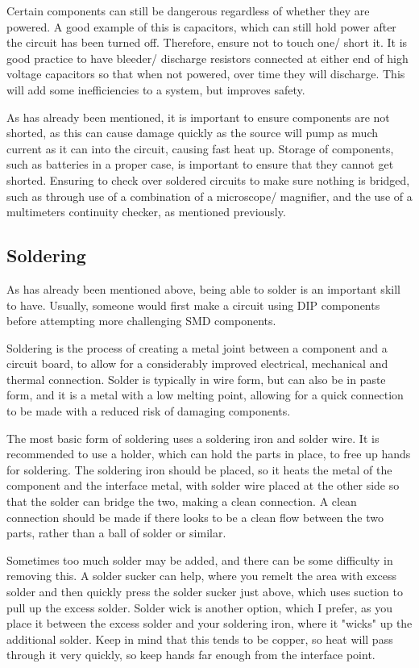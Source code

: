 \documentclass[a4paper,11pt]{report}
\begin{document}
Certain components can still be dangerous regardless of whether they are powered. A good example of this is capacitors, which can still hold power after the circuit has been turned off. Therefore, ensure not to touch one/ short it. It is good practice to have bleeder/ discharge resistors connected at either end of high voltage capacitors so that when not powered, over time they will discharge. This will add some inefficiencies to a system, but improves safety.

As has already been mentioned, it is important to ensure components are not shorted, as this can cause damage quickly as the source will pump as much current as it can into the circuit, causing fast heat up. Storage of components, such as batteries in a proper case, is important to ensure that they cannot get shorted. Ensuring to check over soldered circuits to make sure nothing is bridged, such as through use of a combination of a microscope/ magnifier, and the use of a multimeters continuity checker, as mentioned previously.

\subsection{Soldering}

As has already been mentioned above, being able to solder is an important skill to have. Usually, someone would first make a circuit using DIP components before attempting more challenging SMD components.

Soldering is the process of creating a metal joint between a component and a circuit board, to allow for a considerably improved electrical, mechanical and thermal connection. Solder is typically in wire form, but can also be in paste form, and it is a metal with a low melting point, allowing for a quick connection to be made with a reduced risk of damaging components.

The most basic form of soldering uses a soldering iron and solder wire. It is recommended to use a holder, which can hold the parts in place, to free up hands for soldering. The soldering iron should be placed, so it heats the metal of the component and the interface metal, with solder wire placed at the other side so that the solder can bridge the two, making a clean connection. A clean connection should be made if there looks to be a clean flow between the two parts, rather than a ball of solder or similar.

Sometimes too much solder may be added, and there can be some difficulty in removing this. A solder sucker can help, where you remelt the area with excess solder and then quickly press the solder sucker just above, which uses suction to pull up the excess solder. Solder wick is another option, which I prefer, as you place it between the excess solder and your soldering iron, where it "wicks" up the additional solder. Keep in mind that this tends to be copper, so heat will pass through it very quickly, so keep hands far enough from the interface point.
\end{document}
